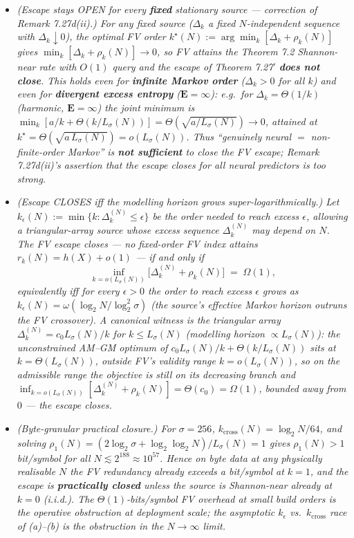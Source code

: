 \documentclass[
]{article}
\begin{document}
\begin{itemize}
\item[\emph{(a)}] \emph{(Escape stays OPEN for every \textbf{fixed}
stationary source --- correction of Remark 7.27d(ii).) For any fixed
source ($\Delta_k$ a fixed $N$-independent sequence with $\Delta_k
\downarrow 0$), the optimal FV order $k^\star(N) := \arg\min_k
[\Delta_k + \rho_k(N)]$ gives $\min_k [\Delta_k + \rho_k(N)] \to 0$, so
FV attains the Theorem 7.2 Shannon-near rate with $O(1)$ query and the
escape of Theorem 7.27$'$ \textbf{does not close}. This holds even for
\textbf{infinite Markov order} ($\Delta_k > 0$ for all $k$) and even for
\textbf{divergent excess entropy} ($\mathbf{E} = \infty$): e.g.\ for
$\Delta_k = \Theta(1/k)$ (harmonic, $\mathbf{E} = \infty$) the joint
minimum is $\min_k [a/k + \Theta(k/L_\sigma(N))] = \Theta(\sqrt{a /
L_\sigma(N)}) \to 0$, attained at $k^\star = \Theta(\sqrt{a\,
L_\sigma(N)}) = o(L_\sigma(N))$. Thus ``genuinely neural $=$
non-finite-order Markov'' is \textbf{not sufficient} to close the FV
escape; Remark 7.27d(ii)'s assertion that the escape closes for all
neural predictors is too strong.}
\item[\emph{(b)}] \emph{(Escape CLOSES iff the modelling horizon grows
super-logarithmically.) Let $k_\epsilon(N) := \min\{k : \Delta_k^{(N)}
\leq \epsilon\}$ be the order needed to reach excess $\epsilon$, allowing
a triangular-array source whose excess sequence $\Delta_k^{(N)}$ may
depend on $N$. The FV escape closes --- no fixed-order FV index attains
$r_k(N) = h(X) + o(1)$ --- if and only if}
\[
  \inf_{k = o(L_\sigma(N))} \bigl[\Delta_k^{(N)} + \rho_k(N)\bigr]
  \;=\; \Omega(1),
\]
\emph{equivalently iff for every $\epsilon > 0$ the order to reach excess
$\epsilon$ grows as $k_\epsilon(N) = \omega(\log_2 N / \log_2^2\sigma)$
(the source's effective Markov horizon outruns the FV crossover). A
canonical witness is the triangular array $\Delta_k^{(N)} =
c_0 L_\sigma(N)/k$ for $k \leq L_\sigma(N)$ (modelling horizon $\propto
L_\sigma(N)$): the unconstrained AM--GM optimum of $c_0 L_\sigma(N)/k +
\Theta(k/L_\sigma(N))$ sits at $k = \Theta(L_\sigma(N))$, \emph{outside}
FV's validity range $k = o(L_\sigma(N))$, so on the admissible range the
objective is still on its decreasing branch and $\inf_{k = o(L_\sigma
(N))}[\Delta_k^{(N)} + \rho_k(N)] = \Theta(c_0) = \Omega(1)$, bounded
away from $0$ --- the escape closes.}
\item[\emph{(c)}] \emph{(Byte-granular practical closure.) For
$\sigma = 256$, $k_{\mathrm{cross}}(N) = \log_2 N / 64$, and solving
$\rho_1(N) = (2\log_2\sigma + \log_2\log_2 N)/L_\sigma(N) = 1$ gives
$\rho_1(N) > 1$ bit/symbol for all $N \lesssim 2^{188} \approx 10^{57}$.
Hence on byte data at any physically realisable $N$ the FV redundancy
already exceeds a bit/symbol at $k = 1$, and the escape is
\textbf{practically closed} unless the source is Shannon-near already at
$k = 0$ (i.i.d.). The
$\Theta(1)$-bits/symbol FV overhead at small build orders is the
operative obstruction at deployment scale; the asymptotic $k_\epsilon$
vs.\ $k_{\mathrm{cross}}$ race of (a)--(b) is the obstruction in the
$N \to \infty$ limit.}
\end{itemize}
\end{document}

